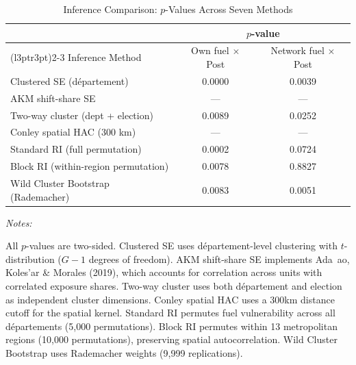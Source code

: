 \begin{table}[!h]
\centering
\caption{Inference Comparison: $p$-Values Across Seven Methods}
\centering
\fontsize{10}{12}\selectfont
\begin{threeparttable}
\begin{tabular}[t]{lcc}
\toprule
\multicolumn{1}{c}{ } & \multicolumn{2}{c}{$p$-value} \\
\cmidrule(l{3pt}r{3pt}){2-3}
Inference Method & Own fuel $\times$ Post & Network fuel $\times$ Post\\
\midrule
Clustered SE (département) & 0.0000 & 0.0039\\
AKM shift-share SE & --- & ---\\
Two-way cluster (dept + election) & 0.0089 & 0.0252\\
Conley spatial HAC (300 km) & --- & ---\\
Standard RI (full permutation) & 0.0002 & 0.0724\\
Block RI (within-region permutation) & 0.0078 & 0.8827\\
Wild Cluster Bootstrap (Rademacher) & 0.0083 & 0.0051\\
\bottomrule
\end{tabular}
\begin{tablenotes}
\item \textit{Notes:} 
\item All $p$-values are two-sided. Clustered SE uses d\'{e}partement-level clustering with $t$-distribution ($G-1$ degrees of freedom). AKM shift-share SE implements Ada~{a}o, Koles'{a}r \& Morales (2019), which accounts for correlation across units with correlated exposure shares. Two-way cluster uses both d\'{e}partement and election as independent cluster dimensions. Conley spatial HAC uses a 300km distance cutoff for the spatial kernel. Standard RI permutes fuel vulnerability across all d\'{e}partements (5,000 permutations). Block RI permutes within 13 metropolitan regions (10,000 permutations), preserving spatial autocorrelation. Wild Cluster Bootstrap uses Rademacher weights (9,999 replications).
\end{tablenotes}
\end{threeparttable}
\end{table}

